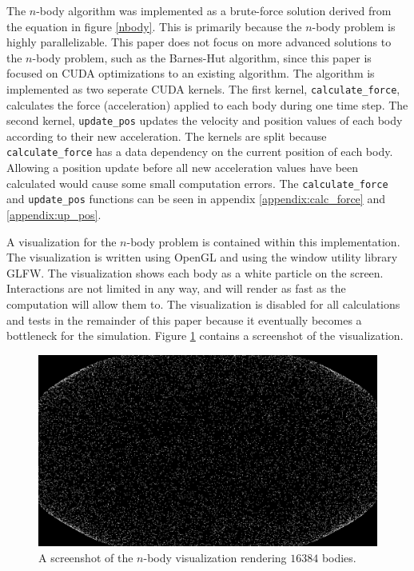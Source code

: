 \documentclass[10pt]{IEEEtran}
\newcommand{\?}{\stackrel{?}{=}}
\begin{document}
The $n$-body algorithm was implemented as a brute-force solution derived from the
equation in figure \ref{nbody}. This is
primarily because the $n$-body problem is highly parallelizable. This paper
does not focus on more advanced solutions to the $n$-body problem, such as the 
Barnes-Hut algorithm\cite{barneshut}, since this paper is focused  
on CUDA optimizations to an existing algorithm. The algorithm is implemented
as two seperate CUDA kernels. The first kernel, \texttt{calculate\_force},
calculates the force (acceleration) applied to each body during one time step.
The second kernel, \texttt{update\_pos} updates the velocity and position values 
of each body according to their new acceleration. The kernels are split because
\texttt{calculate\_force} has a data dependency on the current position of each
body. Allowing a position update before all new acceleration values have been
calculated would cause some small computation errors. The \texttt{calculate\_force}
and \texttt{update\_pos} functions can be seen in appendix \ref{appendix:calc_force}
and \ref{appendix:up_pos}.

A visualization for the $n$-body problem is contained within this implementation.
The visualization is written using OpenGL\cite{opengl} and using the window 
utility library GLFW\cite{glfw}. The visualization shows each body as a white
particle on the screen. Interactions are not limited in any way, and will 
render as fast as the computation will allow them to. The visualization is 
disabled for all calculations and tests in the remainder of this paper because it 
eventually becomes a bottleneck for the simulation. Figure \ref{vis} contains a screenshot of the
visualization.

\begin{figure}
\begin{center}
\includegraphics[scale=.12]{vis.png}
\caption{A screenshot of the $n$-body visualization rendering $16384$ bodies.}
\label{vis}
\end{center}
\end{figure}
\end{document}
